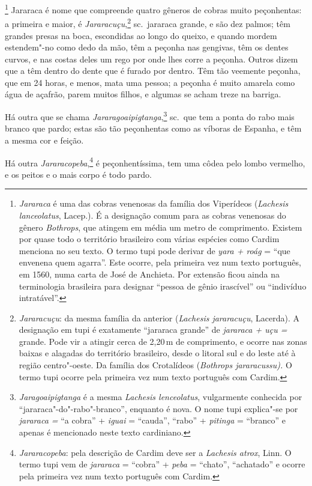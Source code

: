 \footnote{ \textit{Jararaca} é uma das cobras
venenosas da família dos Viperídeos (\textit{Lachesis lanceolatus}, 
Lacep.). É a designação comum para as cobras venenosas do gênero
\textit{Bothrops}, que atingem em média um metro de comprimento.
Existem por quase todo o território brasileiro com várias espécies como
Cardim menciona no seu texto. O termo tupi pode derivar de \textit{yara
+ roág} = ``que envenena quem agarra''. Este ocorre, pela primeira vez 
num texto português, em 1560, numa carta de José de Anchieta.
Por extensão ficou ainda na terminologia brasileira para designar
``pessoa de gênio irascível'' ou ``indivíduo intratável''.} 
Jararaca é nome que compreende quatro gêneros de cobras muito
peçonhentas: a primeira e maior, é \textit{Jararacuçu},\footnote{ \textit{Jararacuçu}: 
da mesma família da anterior (\textit{Lachesis
jararacuçu}, Lacerda). A designação em tupi é exatamente ``jararaca
grande'' de \textit{jararaca + uçu =} grande. Pode vir a atingir cerca
de 2,20\,m de comprimento, e ocorre nas zonas baixas e alagadas do
território brasileiro, desde o litoral sul e do leste até à região
centro"-oeste. Da família dos Crotalídeos (\textit{Bothrops
jararacussu).} O termo tupi ocorre pela primeira vez num texto português
com Cardim.} sc.~jararaca grande, e são dez palmos; têm grandes presas
na boca, escondidas ao longo do queixo, e quando mordem estendem"-no
como dedo da mão, têm a peçonha nas gengivas, têm os dentes curvos, e
nas costas deles um rego por onde lhes corre a peçonha. Outros dizem
que a têm dentro do dente que é furado por dentro. Têm tão veemente
peçonha, que em 24 horas, e menos, mata uma pessoa; a peçonha é muito
amarela como água de açafrão, parem muitos filhos, e algumas se acham
treze na barriga.

 Há outra que se chama \textit{Jararagoaipigtanga},\footnote{ \textit{Jaragoaipigtanga} 
é a mesma \textit{Lachesis lenceolatus}, vulgarmente conhecida por ``jararaca"-do"-rabo"-branco'', enquanto é nova.
O nome tupi explica"-se por \textit{jararaca =} ``a cobra'' + \textit{iguai} = 
``cauda'', ``rabo'' + \textit{pitinga} = ``branco'' e apenas é
mencionado neste texto cardiniano.} sc.~que tem a ponta do rabo mais
branco que pardo; estas são tão peçonhentas como as víboras de Espanha,
e têm a mesma cor e feição.

 Há outra \textit{Jararacopeba},\footnote{ \textit{Jararacopeba}: pela
descrição de Cardim deve ser a \textit{Lachesis atrox}, Linn. O termo
tupi vem de \textit{jararaca} = ``cobra'' + \textit{peba} = 
``chato'', ``achatado'' e ocorre pela primeira vez num
texto português com Cardim.} é peçonhentíssima, tem uma côdea pelo
lombo vermelho, e os peitos e o mais corpo é todo pardo.

